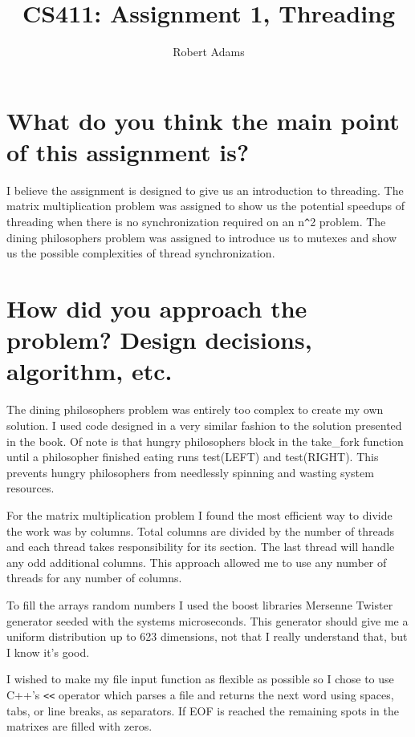 \documentclass[letterpaper,10pt]{article} %
\begin{document}
\title{CS411: Assignment 1, Threading}
\author{Robert Adams}
\maketitle


\section{What do you think the main point of this assignment is? }


I believe the assignment is designed to give us an introduction to threading.
The matrix multiplication problem was assigned to show us the potential
speedups of threading when there is no synchronization required on an 
n\verb|^|2 problem. The dining philosophers problem was assigned to introduce 
us to mutexes and  show us the possible complexities of thread synchronization. 


\section{How did you approach the problem? Design decisions, algorithm, etc.}


The dining philosophers problem was entirely too complex to create my own solution.
I used code designed in a very similar fashion to the solution presented in the
book. Of note is that hungry philosophers block in the take\_fork function until
a philosopher finished eating runs test(LEFT) and test(RIGHT). This prevents 
hungry philosophers from needlessly spinning and wasting system resources.


For the matrix multiplication problem I found the most efficient way to divide 
the work was by columns. Total columns are divided by the number of threads and
each thread takes responsibility for its section. The last thread will handle 
any odd additional columns. This approach allowed me to use any number of threads
for any number of columns.


To fill the arrays random numbers I used the boost libraries Mersenne Twister
generator seeded with the systems microseconds. This generator should give me
a uniform distribution up to 623 dimensions, not that I really understand 
that, but I know it’s good.


I wished to make my file input function as flexible as possible so I chose
to use C++’s \verb|<<| operator which parses a file and returns the next word using 
spaces, tabs, or line breaks, as separators. If EOF is reached the remaining
spots in the matrixes are filled with zeros.
\end{document}

